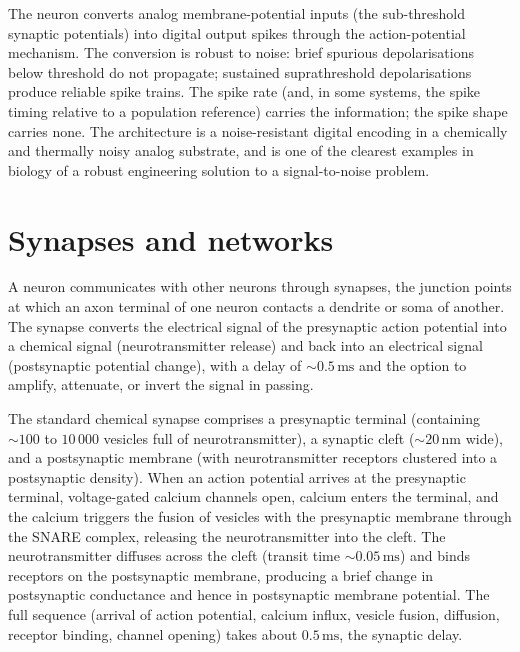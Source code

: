 \begin{principle}
The neuron converts analog membrane-potential inputs (the
sub-threshold synaptic potentials) into digital output spikes through
the action-potential mechanism. The conversion is robust to noise:
brief spurious depolarisations below threshold do not propagate;
sustained suprathreshold depolarisations produce reliable spike
trains. The spike rate (and, in some systems, the spike timing
relative to a population reference) carries the information; the
spike shape carries none. The architecture is a noise-resistant
digital encoding in a chemically and thermally noisy analog substrate,
and is one of the clearest examples in biology of a robust engineering
solution to a signal-to-noise problem.
\end{principle}

\section{Synapses and networks}

A neuron communicates with other neurons through synapses, the
junction points at which an axon terminal of one neuron contacts a
dendrite or soma of another. The synapse converts the electrical
signal of the presynaptic action potential into a chemical signal
(neurotransmitter release) and back into an electrical signal
(postsynaptic potential change), with a delay of $\sim 0.5\,\text{ms}$
and the option to amplify, attenuate, or invert the signal in passing.



 The standard chemical synapse comprises
a presynaptic terminal (containing $\sim 100$ to $10\,000$ vesicles
full of neurotransmitter), a synaptic cleft ($\sim 20\,\text{nm}$
wide), and a postsynaptic membrane (with neurotransmitter receptors
clustered into a postsynaptic density). When an action potential
arrives at the presynaptic terminal, voltage-gated calcium channels
open, calcium enters the terminal, and the calcium triggers the fusion
of vesicles with the presynaptic membrane through the SNARE
complex, releasing the neurotransmitter into the cleft. The
neurotransmitter diffuses across the cleft (transit time
$\sim 0.05\,\text{ms}$) and binds receptors on the postsynaptic
membrane, producing a brief change in postsynaptic conductance and
hence in postsynaptic membrane potential. The full sequence
(arrival of action potential, calcium influx, vesicle fusion,
diffusion, receptor binding, channel opening) takes about
$0.5\,\text{ms}$, the synaptic delay.

